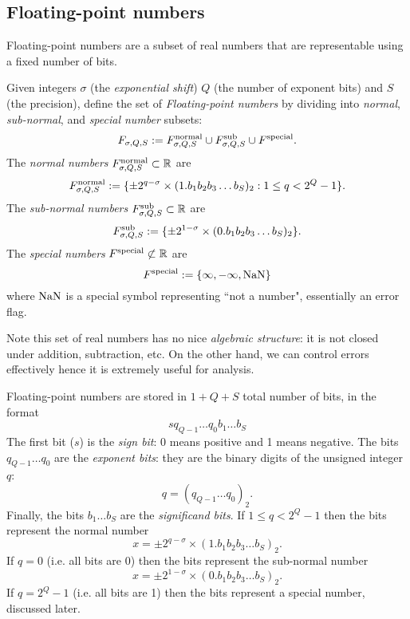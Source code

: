 \subsection{Floating-point numbers}
Floating-point numbers are a subset of real numbers that are representable using a fixed number of bits.

\begin{definition} Given integers $\ensuremath{\sigma}$ (the \emph{exponential shift}) $Q$ (the number of exponent bits) and  $S$ (the precision), define the set of \emph{Floating-point numbers} by dividing into \emph{normal}, \emph{sub-normal}, and \emph{special number} subsets:
\[
F_{\ensuremath{\sigma},Q,S} := F^{\rm normal}_{\ensuremath{\sigma},Q,S} \cup F^{\rm sub}_{\ensuremath{\sigma},Q,S} \cup F^{\rm special}.
\]
The \emph{normal numbers} $F^{\rm normal}_{\sigma,Q,S} \subset {\mathbb R}$ are
\[
F^{\rm normal}_{\ensuremath{\sigma},Q,S} := \{\ensuremath{\pm} 2^{q-\ensuremath{\sigma}} \ensuremath{\times} (1.b_1b_2b_3\ensuremath{\ldots}b_S)_2 : 1 \ensuremath{\leq} q < 2^Q-1 \}.
\]
The \emph{sub-normal numbers} $F^{\rm sub}_{\sigma,Q,S} \subset {\mathbb R}$ are
\[
F^{\rm sub}_{\ensuremath{\sigma},Q,S} := \{\ensuremath{\pm} 2^{1-\ensuremath{\sigma}} \ensuremath{\times} (0.b_1b_2b_3\ensuremath{\ldots}b_S)_2\}.
\]
The \emph{special numbers} $F^{\rm special} \not\subset {\mathbb R}$ are 
\[
F^{\rm special} :=  \{\ensuremath{\infty}, -\ensuremath{\infty}, {\rm NaN}\}
\]
where ${\rm NaN}$ is a special symbol representing ``not a number", essentially an error flag. \end{definition}

Note this set of real numbers has no nice \emph{algebraic structure}: it is not closed under addition, subtraction, etc. On the other hand, we can control errors effectively hence it is extremely useful for analysis.

Floating-point numbers are stored in $1 + Q + S$ total number of bits, in the format
\[
sq_{Q-1}\ensuremath{\ldots}q_0 b_1 \ensuremath{\ldots}b_S
\]
The first bit ($s$) is the \emph{sign bit}: 0 means positive and 1 means negative. The bits $q_{Q-1}\ensuremath{\ldots}q_0$ are the \emph{exponent bits}: they are the binary digits of the unsigned integer $q$: 
\[
q = (q_{Q-1}\ensuremath{\ldots}q_0)_2.
\]
Finally, the bits $b_1\ensuremath{\ldots}b_S$ are the \emph{significand bits}. If $1 \ensuremath{\leq} q < 2^Q-1$ then the bits represent the normal number
\[
x = \ensuremath{\pm} 2^{q-\ensuremath{\sigma}} \ensuremath{\times} (1.b_1b_2b_3\ensuremath{\ldots}b_S)_2.
\]
If $q = 0$ (i.e. all bits are 0) then the bits represent the sub-normal number
\[
x = \ensuremath{\pm} 2^{1-\ensuremath{\sigma}} \ensuremath{\times} (0.b_1b_2b_3\ensuremath{\ldots}b_S)_2.
\]
If $q = 2^Q-1$  (i.e. all bits are 1) then the bits represent a special number, discussed later.

